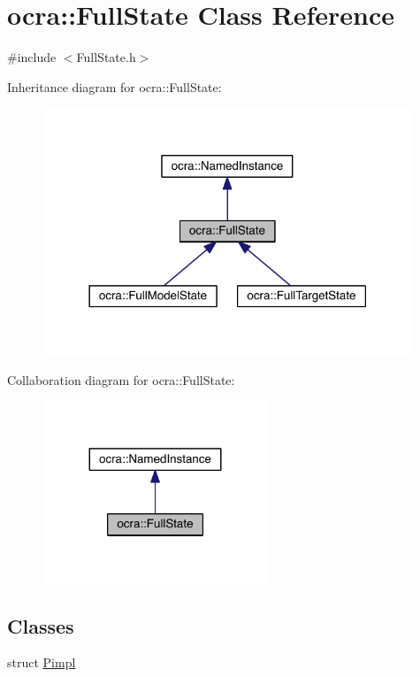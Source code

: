 \hypertarget{classocra_1_1FullState}{}\section{ocra\+:\+:Full\+State Class Reference}
\label{classocra_1_1FullState}


{\ttfamily \#include $<$Full\+State.\+h$>$}



Inheritance diagram for ocra\+:\+:Full\+State\+:\nopagebreak
\begin{figure}[H]
\begin{center}
\leavevmode
\includegraphics[width=314pt]{d3/d2a/classocra_1_1FullState__inherit__graph}
\end{center}
\end{figure}


Collaboration diagram for ocra\+:\+:Full\+State\+:\nopagebreak
\begin{figure}[H]
\begin{center}
\leavevmode
\includegraphics[width=191pt]{d2/d7f/classocra_1_1FullState__coll__graph}
\end{center}
\end{figure}
\subsection*{Classes}
\begin{DoxyCompactItemize}
\item 
struct \hyperlink{structocra_1_1FullState_1_1Pimpl}{Pimpl}
\end{DoxyCompactItemize}

